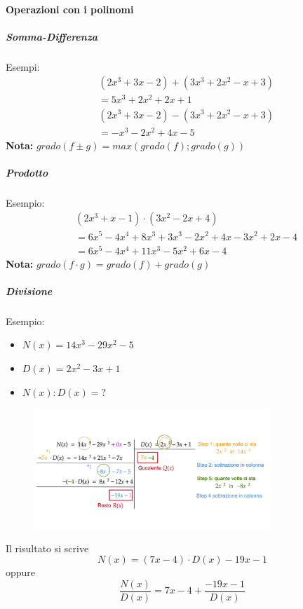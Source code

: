 \documentclass[../main.tex]{subfiles}
\begin{document}
\pagebreak
\paragraph{Operazioni con i polinomi}
\subparagraph{Somma-Differenza}

Esempi:
\begin{align*}
    &(2x^3 + 3x -2) + (3x^3 + 2x^2 -x + 3) \\
    &= 5x^3 + 2x^2 + 2x + 1
\end{align*}
\begin{align*}
    &(2x^3 + 3x -2) - (3x^3 + 2x^2 -x + 3) \\
    &= -x^3 -2x^2 + 4 x - 5 
\end{align*}
\textbf{Nota:} $grado(f\pm g) = max(grado(f);grado(g))$

\subparagraph{Prodotto}

Esempio:
\begin{align*}
    &(2x^3 + x - 1) \cdot (3x^2 -2x + 4) \\
    &= 6x^5 - 4x^4 + 8x^3 + 3x^3 - 2x^2 + 4x - 3x^2 + 2x -4 \\
    &= 6x^5 - 4x^4 + 11x^3 -5x^2 + 6x -4
\end{align*}
\textbf{Nota:} $grado(f \cdot g) = grado(f) + grado(g)$

\subparagraph{Divisione}

Esempio:
\begin{itemize}
    \item $N(x) = 14x^3 -29x^2 -5$
    \item $D(x) = 2x^2 -3x + 1$
    \item $N(x) : D(x) = ?$
\end{itemize}
\begin{figure}[h]
    \centering
    \includegraphics[width=0.8\textwidth]{images/divisionePolinomiale.png}
\end{figure}

Il risultato si scrive
$$
    N(x) = (7x-4) \cdot D(x) -19x -1
$$
oppure
$$
    \frac{N(x)}{D(x)} = 7x-4 + \frac{-19x-1}{D(x)}
$$
\end{document}
